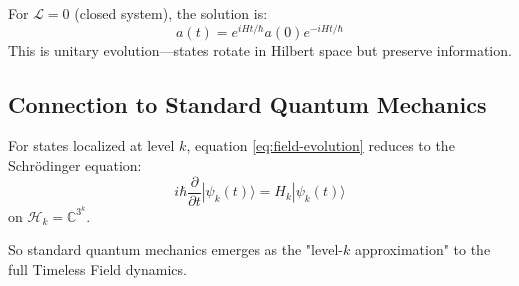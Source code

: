 \begin{example}
For $\mathcal{L} = 0$ (closed system), the solution is:
\begin{equation}
a(t) = e^{iHt/\hbar} a(0) e^{-iHt/\hbar}
\end{equation}
This is unitary evolution—states rotate in Hilbert space but preserve information.
\end{example}

\subsection{Connection to Standard Quantum Mechanics}

\begin{proposition}\label{prop:schrodinger}
For states localized at level $k$, equation \eqref{eq:field-evolution} reduces to the Schrödinger equation:
\begin{equation}
i\hbar \frac{\partial}{\partial t}|\psi_k(t)\rangle = H_k |\psi_k(t)\rangle
\end{equation}
on $\mathcal{H}_k = \mathbb{C}^{3^k}$.
\end{proposition}

So standard quantum mechanics emerges as the "level-$k$ approximation" to the full Timeless Field dynamics.

